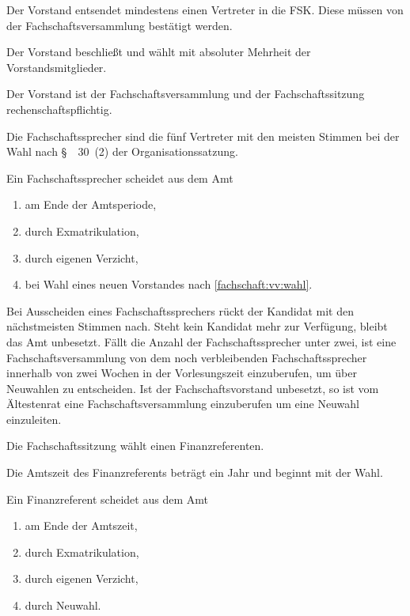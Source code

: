 \documentclass[a4paper, parskip=half, numbers=noenddot]{scrartcl}
\begin{document}
\begin{contract}
Der Vorstand entsendet mindestens einen Vertreter in die FSK. Diese müssen von der Fachschaftsversammlung bestätigt werden.

Der Vorstand beschließt und wählt mit absoluter Mehrheit der Vorstandsmitglieder.

Der Vorstand ist der Fachschaftsversammlung und der Fachschaftssitzung rech\-en\-schafts\-pflichtig.


%
%

%
\label{fs:sprecher}

Die Fachschaftssprecher sind die fünf Vertreter mit den meisten Stimmen bei der Wahl nach §~~30~(2) der Organisationssatzung.

Ein Fachschaftssprecher scheidet aus dem Amt
  \begin{enumerate}
  \item am Ende der Amtsperiode,
  \item durch Exmatrikulation,
  \item durch eigenen Verzicht,
  \item bei Wahl eines neuen Vorstandes nach \ref{fachschaft:vv:wahl}.
\end{enumerate}

Bei Ausscheiden eines Fach\-schaftssprechers rückt der Kandidat mit den nächstmeisten Stimmen nach. Steht kein Kandidat mehr zur Verfügung, bleibt das Amt unbesetzt. Fällt die Anzahl der Fachschaftssprecher unter zwei, ist eine Fachschaftsversammlung von dem noch verbleibenden Fachschaftssprecher innerhalb von zwei Wochen in der Vorlesungszeit einzuberufen, um über Neuwahlen zu entscheiden. Ist der Fachschaftsvorstand unbesetzt, so ist vom Ältestenrat eine Fachschaftsversammlung einzuberufen um eine Neuwahl einzuleiten.


%
%


Die Fachschaftssitzung wählt einen Finanzreferenten.

Die Amtszeit des Finanzreferents beträgt ein Jahr und beginnt mit der Wahl.

Ein Finanzreferent scheidet aus dem Amt
\begin{enumerate}
\item am Ende der Amtszeit,
\item durch Exmatrikulation,
\item durch eigenen Verzicht,
\item durch Neuwahl.
\end{enumerate}


\end{contract}
\end{document}
